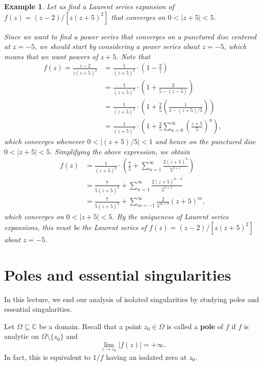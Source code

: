 \documentclass[10pt]{article}
\newcommand{\C}{\mathbb{C}}
\theoremstyle{newstyle}
\newtheorem{exmp}[thm]{Example}
\begin{document}
\begin{exmp}
Let us find a Laurent series expansion of $f(z) = (z-2)/[z(z+5)^2]$ that converges on 
$0 < |z+5| < 5$. 

Since we want to find a power series that converges on a punctured disc centered at $z = -5$, 
we should start by considering a power series about $z = -5$, which means that we want 
powers of $z+5$. Note that 
\begin{align*}
    f(z) = \frac{z-2}{z(z+5)^2} 
    &= \frac{1}{(z+5)^2} \cdot \left( 1 - \frac2z \right) \\
    &= \frac{1}{(z+5)^2} \cdot \left( 1 + \frac{2}{5 - (z-5)} \right) \\
    &= \frac{1}{(z+5)^2} \cdot \left( 1 + \frac25 \left( \frac{1}{1 - (z+5)/5} \right) \right) \\
    &= \frac{1}{(z+5)^2} \cdot \left( 1 + \frac25 \sum_{n=0}^\infty \left( \frac{z+5}5 \right)^n \right),
\end{align*}
which converges whenever $0 < |(z+5)/5| < 1$ and hence on the punctured disc $0 < |z+5| < 5$. 
Simplifying the above expression, we obtain 
\begin{align*}
    f(z) &= \frac{1}{(z+5)^2} \cdot \left( \frac75 + \sum_{n=1}^\infty \frac{2(z+5)^n}{5^{n+1}} \right) \\
    &= \frac7{5(z+5)^2} + \sum_{n=1}^\infty \frac{2(z+5)^{n-2}}{5^{n+1}} \\
    &= \frac7{5(z+5)^2} + \sum_{m=-1}^\infty \frac{2}{5^{m+3}} (z+5)^m, 
\end{align*}
which converges on $0 < |z+5| < 5$. By the uniqueness of Laurent series expansions, this must 
be the Laurent series of $f(z) = (z-2)/[z(z+5)^2]$ about $z = -5$. 
\end{exmp}

\newpage 
\section{Poles and essential singularities}

In this lecture, we end our analysis of isolated singularities by studying poles and essential 
singularities. 

Let $\Omega \subseteq \C$ be a domain. Recall that a point $z_0 \in \Omega$ is called a 
{\bf pole} of $f$ if $f$ is analytic on $\Omega \setminus \{z_0\}$ and 
\[ \lim_{z\to z_0} |f(z)| = +\infty. \]
In fact, this is equivalent to $1/f$ having an isolated zero at $z_0$. 
\end{document}
